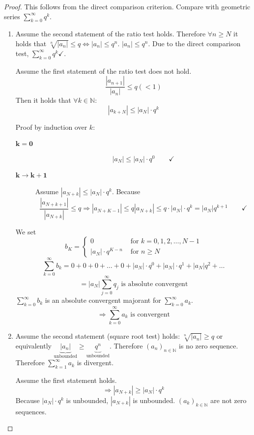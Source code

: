 \documentclass[a4paper,landscape,twocolumn]{article}
\theoremstyle{definition}
\newcommand\abs[1]{\left|#1\right|}
\newcommand\seq[1]{{\left(#1\right)}_{n \in \mathbb N}}
\begin{document}
\begin{proof}
  This follows from the direct comparison criterion. Compare with geometric series
  $\sum_{k=0}^\infty q^k$.
  \begin{enumerate}
    \item
      Assume the second statement of the ratio test holds. Therefore $\forall n \geq N$
      it holds that $\sqrt[n]{\abs{a_n}} \leq q \Leftrightarrow \abs{a_n} \leq q^n$.
      $\abs{a_n} \leq q^n$.
      Due to the direct comparison test, $\sum_{k=0}^\infty q^k \checkmark$.

      Assume the first statement of the ratio test does not hold.
      \[ \frac{\abs{a_{n+1}}}{\abs{a_n}} \leq q (< 1) \]
      Then it holds that $\forall k \in \mathbb N$:
      \[ \abs{a_{k+N}} \leq \abs{a_N} \cdot q^k \]

      Proof by induction over $k$:
      \begin{description}
        \item[$\mathbf{k=0}$] \[ \abs{a_N} \leq \abs{a_N} \cdot q^0 \qquad\checkmark \]
        \item[$\mathbf{k\to k+1}$]
          Assume $\abs{a_{N+k}} \leq \abs{a_N} \cdot q^k$.
          Because
          \[
            \frac{\abs{a_{N+k+1}}}{\abs{a_{N+k}}} \leq q
            \Rightarrow \abs{a_{N+K-1}} \leq q \abs{a_{N+k}}
            \leq q \cdot \abs{a_N} \cdot q^k
            = \abs{a_N} q^{k+1}
            \qquad \checkmark
          \]
      \end{description}
      We set
      \[
        b_K = \begin{cases}
          0 & \text{ for } k = 0,1,2,\dots,N-1 \\
          \abs{a_N} \cdot q^{K-n} & \text{ for } n \geq N
        \end{cases}
      \]
      \[ \sum_{k=0}^\infty b_k = 0 + 0 + 0 + \dots + 0 + \abs{a_N} \cdot q^0 + \abs{a_N} \cdot q^1 + \abs{a_N} q^2 + \ldots \]
      \[ = \abs{a_N} \sum_{j=0}^\infty q_j \text{ is absolute convergent} \]
      $\sum_{k=0}^\infty b_k$ is an absolute convergent majorant for $\sum_{k=0}^\infty a_k$.
      \[ \Rightarrow \sum_{k=0}^\infty a_k \text{ is convergent} \]
    \item
      Assume the second statement (square root test) holds: $\sqrt[n]{\abs{a_n}} \geq q$
      or equivalently $\underbrace{\abs{a_n}}_{\text{unbounded}} \geq \underbrace{q^n}_{\text{unbounded}}$.
      Therefore $\seq{a_n}$ is no zero sequence.
      Therefore $\sum_{k=1}^\infty a_k$ is divergent.

      Assume the first statement holds.
      \[ \Rightarrow \abs{a_{N+k}} \geq \abs{a_N} \cdot q^k \]
      Because $\abs{a_N} \cdot q^k$ is unbounded, $\abs{a_{N+k}}$ is unbounded.
      $\left(a_k\right)_{k\in\mathbb N}$ are not zero sequences.
  \end{enumerate}
\end{proof}
\end{document}
